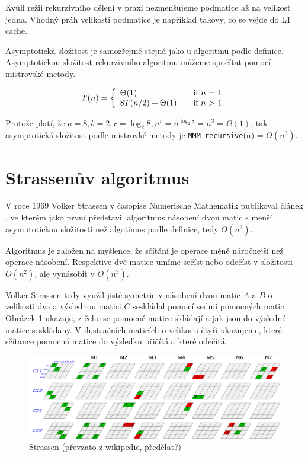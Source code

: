 \documentclass[thesis=B,czech]{FITthesis}[2012/06/26]
\begin{document}
Kvůli režii rekurzivního dělení v praxi nezmenšujeme podmatice až na velikost jedna. Vhodný práh velikosti podmatice je například takový, co se vejde do L1 cache.

Asymptotická složitost je samozřejmě stejná jako u algoritmu podle definice. Asymptotickou složitost rekurzivního algoritmu můžeme spočítat pomocí mistrovské metody.

\[ T(n) = \left\{ 
  \begin{array}{l l}
    \Theta(1) & \quad \text{if $n$ = 1}\\
    8T(n/2) + \Theta(1) & \quad \text{if $n$ > 1}
  \end{array} \right.\]

Protože platí, že $a=8, b=2, r=\log_{2} 8, n^r=n^{\log_{2} 8}=n^3=\Omega(1)$, tak asymptotická složitost podle mistrovké metody je \texttt{MMM-recursive}(n) = $O(n^3)$.

\section{Strassenův algoritmus} %

V roce 1969 Volker Strassen v časopise Numerische Mathematik publikoval článek \cite{GEMnO}, ve kterém jako první představil algoritmus násobení dvou matic s menší asymptotickou složitostí než algotimus podle definice, tedy $O(n^3)$.

Algoritmus je založen na myšlence, že sčítání je operace méně náročnejší než operace násobení. Respektive dvě matice umíme sečíst nebo odečíst v složitosti $O(n^2)$, ale vynásobit v $O(n^3)$.

Volker Strassen tedy využil jisté symetrie \cite{StrNat} v násobení dvou matic $A$ a $B$ o velikosti dva a výslednou matici $C$ seskládal pomocí sedmi pomocných matic. Obrázek \ref{fig:StrVis} ukazuje, z čeho se pomocné matice skládají a jak jsou do výsledné matice seskládany. V ilustračních maticích o velikosti čtyři ukazujeme, které sčítance pomocná matice do výsledku přičítá a které odečítá. 

\begin{figure}[H]\centering
	\includegraphics[width=\textwidth]{./images/strassen}
	\caption{Strassen (převzato z wikipedie, předělat?)}
	\label{fig:StrVis}
\end{figure}
\end{document}
